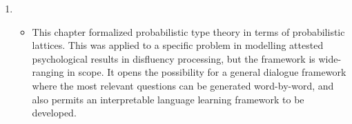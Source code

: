\documentclass[12pt]{article}
\begin{document}
\begin{enumerate}
\item{}\begin{itemize}
\item[]This chapter formalized probabilistic type theory in terms of probabilistic lattices. This was applied to a specific problem in modelling attested psychological results in disfluency processing, but the framework is wide-ranging in scope. It opens the possibility for a general dialogue framework where the most relevant questions can be generated word-by-word, and also permits an interpretable language learning framework to be developed.

\end{itemize}

\end{enumerate}



\end{document}
